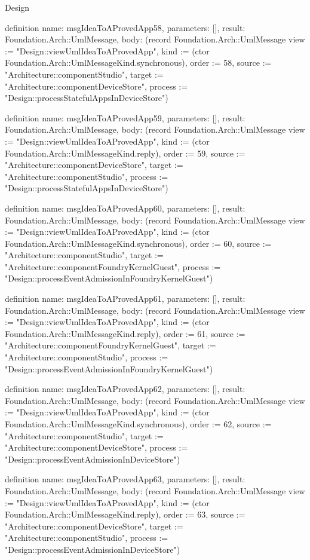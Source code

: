 \begin{lexlean}{Design}
\begin{semanticmodule}
definition{
  name: msgIdeaToAProvedApp58,
  parameters: [],
  result: Foundation.Arch::UmlMessage,
  body: (record Foundation.Arch::UmlMessage {view := "Design::viewUmlIdeaToAProvedApp", kind := (ctor Foundation.Arch::UmlMessageKind.synchronous), order := 58, source := "Architecture::componentStudio", target := "Architecture::componentDeviceStore", process := "Design::processStatefulAppsInDeviceStore"})
}

definition{
  name: msgIdeaToAProvedApp59,
  parameters: [],
  result: Foundation.Arch::UmlMessage,
  body: (record Foundation.Arch::UmlMessage {view := "Design::viewUmlIdeaToAProvedApp", kind := (ctor Foundation.Arch::UmlMessageKind.reply), order := 59, source := "Architecture::componentDeviceStore", target := "Architecture::componentStudio", process := "Design::processStatefulAppsInDeviceStore"})
}

definition{
  name: msgIdeaToAProvedApp60,
  parameters: [],
  result: Foundation.Arch::UmlMessage,
  body: (record Foundation.Arch::UmlMessage {view := "Design::viewUmlIdeaToAProvedApp", kind := (ctor Foundation.Arch::UmlMessageKind.synchronous), order := 60, source := "Architecture::componentStudio", target := "Architecture::componentFoundryKernelGuest", process := "Design::processEventAdmissionInFoundryKernelGuest"})
}

definition{
  name: msgIdeaToAProvedApp61,
  parameters: [],
  result: Foundation.Arch::UmlMessage,
  body: (record Foundation.Arch::UmlMessage {view := "Design::viewUmlIdeaToAProvedApp", kind := (ctor Foundation.Arch::UmlMessageKind.reply), order := 61, source := "Architecture::componentFoundryKernelGuest", target := "Architecture::componentStudio", process := "Design::processEventAdmissionInFoundryKernelGuest"})
}

definition{
  name: msgIdeaToAProvedApp62,
  parameters: [],
  result: Foundation.Arch::UmlMessage,
  body: (record Foundation.Arch::UmlMessage {view := "Design::viewUmlIdeaToAProvedApp", kind := (ctor Foundation.Arch::UmlMessageKind.synchronous), order := 62, source := "Architecture::componentStudio", target := "Architecture::componentDeviceStore", process := "Design::processEventAdmissionInDeviceStore"})
}

definition{
  name: msgIdeaToAProvedApp63,
  parameters: [],
  result: Foundation.Arch::UmlMessage,
  body: (record Foundation.Arch::UmlMessage {view := "Design::viewUmlIdeaToAProvedApp", kind := (ctor Foundation.Arch::UmlMessageKind.reply), order := 63, source := "Architecture::componentDeviceStore", target := "Architecture::componentStudio", process := "Design::processEventAdmissionInDeviceStore"})
}


\end{semanticmodule}
\end{lexlean}
